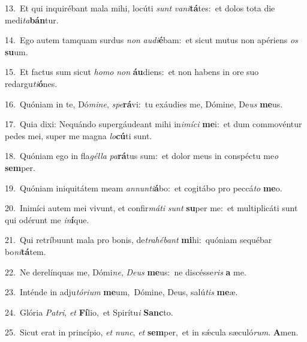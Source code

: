 {\numbfont\textcolor{\numbcolor}{13.}}~Et qui inquirébant mala mihi, locúti \textit{sunt} \textit{va}\-\textit{ni}\textbf{tá}tes:~\star et dolos tota die medi\-\textit{ta}\-\textbf{bán}tur.\par
{\numbfont\textcolor{\numbcolor}{14.}}~Ego autem tamquam surdus \textit{non} \textit{au}\-\textit{di}\textbf{é}bam:~\star et sicut mutus non apériens \textit{os} \textbf{su}\-um.\par
{\numbfont\textcolor{\numbcolor}{15.}}~Et factus sum sicut \textit{ho}\-\textit{mo} \textit{non} \textbf{áu}\-diens:~\star et non habens in ore suo redargu\-\textit{ti}\-\textbf{ó}nes.\par
{\numbfont\textcolor{\numbcolor}{16.}}~Quóniam in te, Dó\-\textit{mi}\-\textit{ne}, \textit{spe}\-\textbf{rá}vi:~\star tu exáudies me, Dómine, De\textit{us} \textbf{me}\-us.\par
{\numbfont\textcolor{\numbcolor}{17.}}~Quia dixi: Nequándo supergáudeant mihi in\-\textit{i}\-\textit{mí}\textit{ci} \textbf{me}\-i:~\star et dum commovéntur pedes mei, super me magna \textit{lo}\-\textbf{cú}ti sunt.\par
{\numbfont\textcolor{\numbcolor}{18.}}~Quóniam ego in fla\-\textit{gél}\-\textit{la} \textit{pa}\-\textbf{rá}tus sum:~\star et dolor meus in conspéctu me\textit{o} \textbf{sem}\-per.\par
{\numbfont\textcolor{\numbcolor}{19.}}~Quóniam iniquitátem meam \textit{an}\-\textit{nun}\textit{ti}\textbf{á}bo:~\star et cogitábo pro peccá\textit{to} \textbf{me}\-o.\par
{\numbfont\textcolor{\numbcolor}{20.}}~Inimíci autem mei vivunt, et confir\-\textit{má}\-\textit{ti} \textit{sunt} \textbf{su}\-per me:~\star et multiplicáti sunt qui odérunt me \textit{in}\-\textbf{í}que.\par
{\numbfont\textcolor{\numbcolor}{21.}}~Qui retríbuunt mala pro bonis, de\-\textit{tra}\-\textit{hé}\textit{bant} \textbf{mi}\-hi:~\star quóniam sequébar bo\-\textit{ni}\-\textbf{tá}tem.\par
{\numbfont\textcolor{\numbcolor}{22.}}~Ne derelínquas me, Dómi\-\textit{ne}\-, \textit{De}\-\textit{us} \textbf{me}\-us:~\star ne discésse\textit{ris} \textbf{a} me.\par
{\numbfont\textcolor{\numbcolor}{23.}}~Inténde in adju\-\textit{tó}\-\textit{ri}\textit{um} \textbf{me}\-um,~\star Dómine, Deus, salú\textit{tis} \textbf{me}\-æ.\par
{\numbfont\textcolor{\numbcolor}{24.}}~Glória \textit{Pa}\-\textit{tri}, \textit{et} \textbf{Fí}\-lio,~\star et Spirítu\textit{i} \textbf{Sanc}\-to.\par
{\numbfont\textcolor{\numbcolor}{25.}}~Sicut erat in princípio, \textit{et} \textit{nunc}\-, \textit{et} \textbf{sem}\-per,~\star et in sǽcula sæculó\-\textit{rum}\-. \textbf{A}\-men.\par
